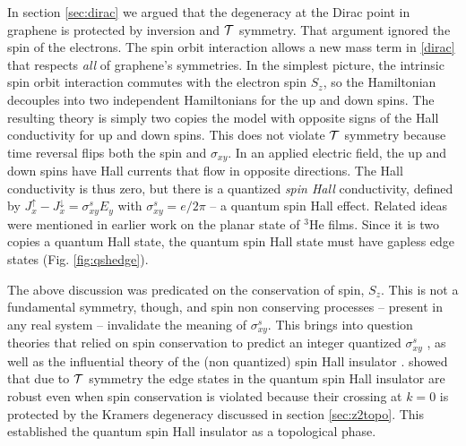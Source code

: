 \documentclass[twocolumn,floatfix,showpacs,rmp,aps]{revtex4}
\begin{document}
In section \ref{sec:dirac} we argued that the degeneracy at the Dirac
point in graphene is protected by inversion and ${\cal T}$
symmetry.  That argument ignored the spin of the
electrons.  The spin orbit interaction allows a new mass
term in \eqref{dirac} that respects {\it all} of graphene's
symmetries.
In the simplest picture, the intrinsic spin orbit interaction
commutes with the electron spin $S_z$, so the Hamiltonian decouples
into two independent Hamiltonians for the up and down spins.  The
resulting theory is simply two copies the \textcite{haldane88} model
with opposite signs of the Hall conductivity for up and down spins.
This does not violate ${\cal T}$ symmetry because time reversal
flips both the spin and $\sigma_{xy}$.  In an applied
electric field, the up and down spins have Hall currents that flow in
opposite directions.  The Hall conductivity is thus zero, but there
is a quantized {\it spin Hall} conductivity, defined by
$J_x^\uparrow-J_x^\downarrow = \sigma_{xy}^s E_y$ with
$\sigma_{xy}^s = e/2\pi$ --
a quantum spin Hall effect.  Related ideas were mentioned in
earlier work on the planar state of $^3$He films\cite{volovik89}.
Since it is two copies a quantum Hall state, the quantum
spin Hall state must have gapless edge states (Fig. \ref{fig:qshedge}).

The above discussion was predicated on the conservation of
spin, $S_z$.  This is not a fundamental symmetry, though, and spin
non conserving processes -- present in any real system -- invalidate the
meaning of $\sigma_{xy}^s$.  This brings into
question theories that relied on spin conservation to predict an
integer quantized $\sigma_{xy}^s$ \cite{volovik89,bernevig06,qi06}, as well as the
influential theory of the (non quantized) spin Hall insulator \cite{murakami04}.
\textcite{kanemele05a} showed that due to ${\cal T}$ symmetry
the edge states in the quantum spin Hall insulator are robust
even when spin conservation is violated because their crossing at $k=0$ is
protected by the Kramers degeneracy discussed in section
\ref{sec:z2topo}.  This established the quantum spin Hall insulator as a
topological phase.
\end{document}
